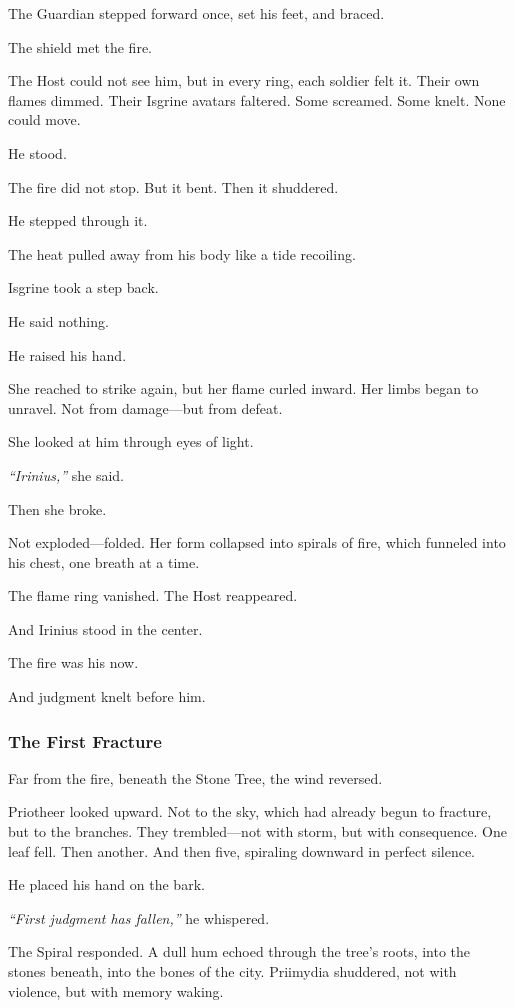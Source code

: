 \documentclass[12pt]{article}
\begin{document}
The Guardian stepped forward once, set his feet, and braced.

The shield met the fire.

The Host could not see him, but in every ring, each soldier felt it. Their own flames dimmed. Their Isgrine avatars faltered. Some screamed. Some knelt. None could move.

He stood.

The fire did not stop. But it bent. Then it shuddered.

He stepped through it.

The heat pulled away from his body like a tide recoiling.

Isgrine took a step back.

He said nothing.

He raised his hand.

She reached to strike again, but her flame curled inward. Her limbs began to unravel. Not from damage—but from defeat.

She looked at him through eyes of light.

\textit{``Irinius,''} she said.

Then she broke.

Not exploded—folded. Her form collapsed into spirals of fire, which funneled into his chest, one breath at a time.

The flame ring vanished. The Host reappeared.

And Irinius stood in the center.

The fire was his now.

And judgment knelt before him.

\dotfill

\subsubsection{The First Fracture}

Far from the fire, beneath the Stone Tree, the wind reversed.

Priotheer looked upward. Not to the sky, which had already begun to fracture, but to the branches. They trembled—not with storm, but with consequence. One leaf fell. Then another. And then five, spiraling downward in perfect silence.

He placed his hand on the bark.

\textit{``First judgment has fallen,''} he whispered.

The Spiral responded. A dull hum echoed through the tree's roots, into the stones beneath, into the bones of the city. Priimydia shuddered, not with violence, but with memory waking.
\end{document}
